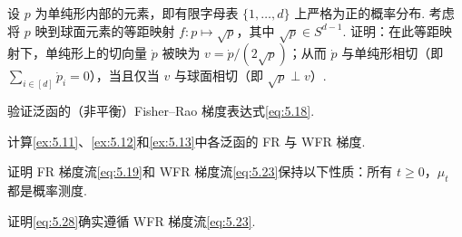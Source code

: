\begin{exercise}\label{exer:5.13}
设 $p$ 为单纯形内部的元素，即有限字母表 $\{1,\ldots,d\}$ 上严格为正的概率分布. 考虑将 $p$ 映到球面元素的等距映射 $f:p\mapsto\sqrt p$，其中 $\sqrt p\in S^{d-1}$. 证明：在此等距映射下，单纯形上的切向量 $\dot p$ 被映为 $v=\dot p/(2\sqrt p)$；从而 $\dot p$ 与单纯形相切（即 $\sum_{i\in[d]}\dot p_i=0$），当且仅当 $v$ 与球面相切（即 $\sqrt p\perp v$）.
\end{exercise}

\begin{exercise}\label{exer:5.14}
验证泛函的（非平衡）Fisher--Rao 梯度表达式\eqref{eq:5.18}.
\end{exercise}

\begin{exercise}\label{exer:5.15}
计算\autoref{ex:5.11}、\autoref{ex:5.12}和\autoref{ex:5.13}中各泛函的 FR 与 WFR 梯度.
\end{exercise}

\begin{exercise}\label{exer:5.16}
证明 FR 梯度流\eqref{eq:5.19}和 WFR 梯度流\eqref{eq:5.23}保持以下性质：所有 $t\geq0$，$\mu_t$ 都是概率测度.
\end{exercise}

\begin{exercise}\label{exer:5.17}
证明\eqref{eq:5.28}确实遵循 WFR 梯度流\eqref{eq:5.23}.
\end{exercise}
